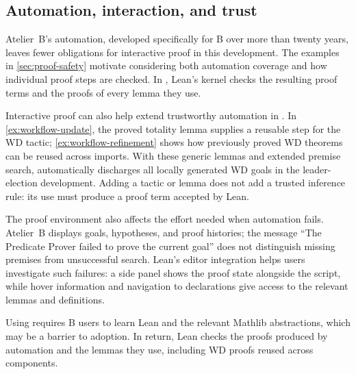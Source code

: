 \subsection{Automation, interaction, and trust}

Atelier~B's automation, developed specifically for B over more than twenty years, leaves fewer obligations for interactive proof in this development.
The examples in \cref{sec:proof-safety} motivate considering both automation coverage and how individual proof steps are checked.
In \barrel, Lean's kernel checks the resulting proof terms and the proofs of every lemma they use.

Interactive proof can also help extend trustworthy automation in \barrel.
In \cref{ex:workflow-update}, the proved totality lemma supplies a reusable step for the WD tactic; \cref{ex:workflow-refinement} shows how previously proved WD theorems can be reused across imports.
With these generic lemmas and extended premise search, \barrel automatically discharges all locally generated WD goals in the leader-election development.
Adding a tactic or lemma does not add a trusted inference rule: its use must produce a proof term accepted by Lean.

The proof environment also affects the effort needed when automation fails.
Atelier~B displays goals, hypotheses, and proof histories; the message ``The Predicate Prover failed to prove the current goal'' does not distinguish missing premises from unsuccessful search.
Lean's editor integration helps users investigate such failures: a side panel shows the proof state alongside the script, while hover information and navigation to declarations give access to the relevant lemmas and definitions.

Using \barrel requires B users to learn Lean and the relevant Mathlib abstractions, which may be a barrier to adoption. In return, Lean checks the proofs produced by automation and the lemmas they use, including WD proofs reused across components.
